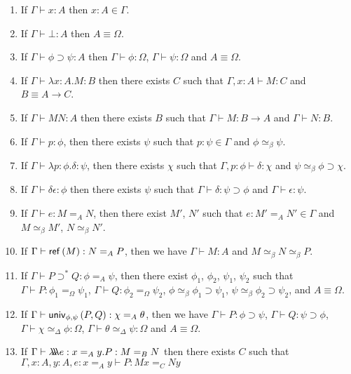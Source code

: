 \begin{lemma}[Generation]
$ $
\begin{enumerate}
\item
If $\Gamma \vdash x : A$ then $x : A \in \Gamma$.
\item
If $\Gamma \vdash \bot : A$ then $A \equiv \Omega$.
\item
If $\Gamma \vdash \phi \supset \psi : A$ then $\Gamma \vdash \phi : \Omega$, $\Gamma \vdash \psi : \Omega$ and $A \equiv \Omega$.
\item
If $\Gamma \vdash \lambda x:A.M : B$ then there exists $C$ such that $\Gamma, x : A \vdash M : C$ and $B \equiv A \rightarrow C$.
\item
If $\Gamma \vdash MN : A$ then there exists $B$ such that $\Gamma \vdash M : B \rightarrow A$ and $\Gamma \vdash N : B$.
\item
If $\Gamma \vdash p : \phi$, then there exists $\psi$ such that $p : \psi \in \Gamma$ and $\phi \simeq_\beta \psi$.
\item
If $\Gamma \vdash \lambda p:\phi.\delta : \psi$, then there exists $\chi$ such that $\Gamma, p : \phi \vdash \delta : \chi$ and $\psi \simeq_\beta \phi \supset \chi$.
\item
If $\Gamma \vdash \delta \epsilon : \phi$ then there exists $\psi$ such that $\Gamma \vdash \delta : \psi \supset \phi$ and $\Gamma \vdash \epsilon : \psi$.
\item
If $\Gamma \vdash e : M =_A N$, then there exist $M'$, $N'$ such that $e : M' =_A N' \in \Gamma$ and $M \simeq_\beta M'$, $N \simeq_\beta N'$.
\item
If $\Gamma \vdash \mathsf{ref} \left( {M} \right) : N =_A P$, then we have $\Gamma \vdash M : A$ and $M \simeq_\beta N \simeq_\beta P$.
\item
If $\Gamma \vdash P \supset^* Q : \phi =_A \psi$, then there exist $\phi_1$, $\phi_2$, $\psi_1$, $\psi_2$ such that
$\Gamma \vdash P : \phi_1 =_\Omega \psi_1$, $\Gamma \vdash Q : \phi_2 =_\Omega \psi_2$, $\phi \simeq_\beta \phi_1 \supset \psi_1$, $\psi \simeq_\beta \phi_2 \supset \psi_2$, and $A \equiv \Omega$.
\item
If $\Gamma \vdash \mathsf{univ}_{{\phi} , {\psi}} \left( {P} , {Q} \right) : \chi =_A \theta$, then we have $\Gamma \vdash P : \phi \supset \psi$, $\Gamma \vdash Q : \psi \supset \phi$,
$\Gamma \vdash \chi \simeq_\Delta \phi : \Omega$, $\Gamma \vdash \theta \simeq_\Delta \psi : \Omega$ and $A \equiv \Omega$.
\item
If $\Gamma \vdash \lambda \!\! \lambda \!\! \lambda e : x =_A y. P : M =_B N$ then there exists $C$ such that $\Gamma, x : A, y : A, e : x =_A y \vdash P : M x =_C N y$

\end{enumerate}
\end{lemma}
